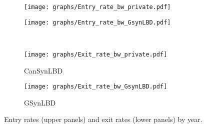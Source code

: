 \begin{figure}[ht]
   \begin{subfigure}[h]{0.48\linewidth}
     \texttt{[image: graphs/Entry\_rate\_bw\_private.pdf]}
   \end{subfigure}
\hfill
   \begin{subfigure}[h]{0.48\linewidth}
      \texttt{[image: graphs/Entry\_rate\_bw\_GsynLBD.pdf]}
   \end{subfigure}\\
   \begin{subfigure}[h]{0.48\linewidth}
     \texttt{[image: graphs/Exit\_rate\_bw\_private.pdf]}
    \caption{CanSynLBD}
   \end{subfigure}
\hfill
   \begin{subfigure}[h]{0.48\linewidth}
     \texttt{[image: graphs/Exit\_rate\_bw\_GsynLBD.pdf]}
     \caption{GSynLBD}
   \end{subfigure}
\caption{Entry rates (upper panels) and exit rates (lower panels) by year.\label{fig:FirmDynamics}}
\end{figure}
